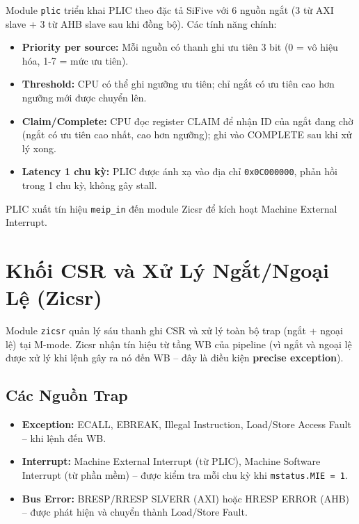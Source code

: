 Module \texttt{plic} triển khai PLIC theo đặc tả SiFive với 6 nguồn ngắt (3 từ AXI slave + 3 từ AHB slave sau khi đồng bộ). Các tính năng chính:

\begin{itemize}
    \item \textbf{Priority per source:} Mỗi nguồn có thanh ghi ưu tiên 3 bit (0 = vô hiệu hóa, 1-7 = mức ưu tiên).
    \item \textbf{Threshold:} CPU có thể ghi ngưỡng ưu tiên; chỉ ngắt có ưu tiên cao hơn ngưỡng mới được chuyển lên.
    \item \textbf{Claim/Complete:} CPU đọc register CLAIM để nhận ID của ngắt đang chờ (ngắt có ưu tiên cao nhất, cao hơn ngưỡng); ghi vào COMPLETE sau khi xử lý xong.
    \item \textbf{Latency 1 chu kỳ:} PLIC được ánh xạ vào địa chỉ \texttt{0x0C000000}, phản hồi trong 1 chu kỳ, không gây stall.
\end{itemize}

PLIC xuất tín hiệu \texttt{meip\_in} đến module Zicsr để kích hoạt Machine External Interrupt.

\section{Khối CSR và Xử Lý Ngắt/Ngoại Lệ (Zicsr)}

Module \texttt{zicsr} quản lý sáu thanh ghi CSR và xử lý toàn bộ trap (ngắt + ngoại lệ) tại M-mode. Zicsr nhận tín hiệu từ tầng WB của pipeline (vì ngắt và ngoại lệ được xử lý khi lệnh gây ra nó đến WB -- đây là điều kiện \textbf{precise exception}).

\subsection{Các Nguồn Trap}

\begin{itemize}
    \item \textbf{Exception:} ECALL, EBREAK, Illegal Instruction, Load/Store Access Fault -- khi lệnh đến WB.
    \item \textbf{Interrupt:} Machine External Interrupt (từ PLIC), Machine Software Interrupt (từ phần mềm) -- được kiểm tra mỗi chu kỳ khi \texttt{mstatus.MIE = 1}.
    \item \textbf{Bus Error:} BRESP/RRESP SLVERR (AXI) hoặc HRESP ERROR (AHB) -- được phát hiện và chuyển thành Load/Store Fault.
\end{itemize}

